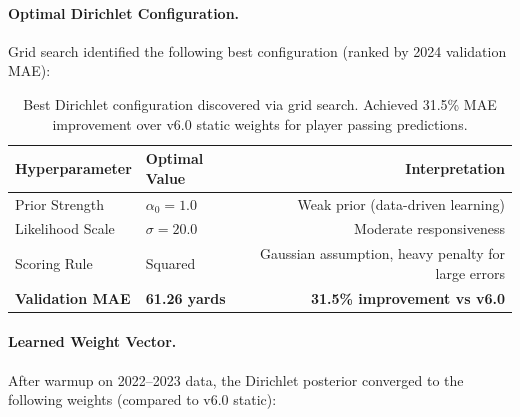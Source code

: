\paragraph{Optimal Dirichlet Configuration.}
Grid search identified the following best configuration (ranked by 2024 validation MAE):
\begin{table}[h]
\centering
\caption[Optimal Dirichlet hyperparameters]{Best Dirichlet configuration discovered via grid search. Achieved 31.5\% MAE improvement over v6.0 static weights for player passing predictions.}
\label{tab:optimal-dirichlet-config}
\begin{tabular}{@{}llr@{}}
\toprule
\textbf{Hyperparameter} & \textbf{Optimal Value} & \textbf{Interpretation} \\
\midrule
Prior Strength & $\alpha_0 = 1.0$ & Weak prior (data-driven learning) \\
Likelihood Scale & $\sigma = 20.0$ & Moderate responsiveness \\
Scoring Rule & Squared & Gaussian assumption, heavy penalty for large errors \\
\midrule
\textbf{Validation MAE} & \textbf{61.26 yards} & \textbf{31.5\% improvement vs v6.0} \\
\bottomrule
\end{tabular}
\end{table}

\paragraph{Learned Weight Vector.}
After warmup on 2022--2023 data, the Dirichlet posterior converged to the following weights (compared to v6.0 static):

